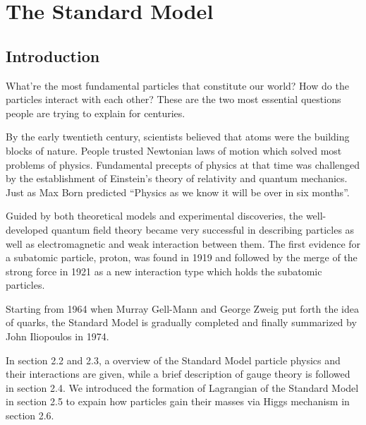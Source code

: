 \chapter{The Standard Model}

\label{ch:Standard Model}

\section{Introduction}
\par   What're the most fundamental particles that constitute our world? How do the particles interact with each other? These are the two most essential questions people are trying to explain for centuries.

\par By the early twentieth century, scientists believed that atoms were the building blocks of nature. People trusted Newtonian laws of motion which solved most problems of physics.
Fundamental precepts of physics at that time was challenged by the establishment of Einstein's theory of relativity and quantum mechanics.
Just as Max Born predicted ``Physics as we know it will be over in six months''.

\par Guided by both theoretical models and experimental discoveries, the well-developed quantum field theory became very successful in describing particles as well as 
electromagnetic and weak interaction between them. The first evidence for a subatomic particle, proton, was found in 1919 and followed by the merge of the strong force in 1921 as a new interaction type which holds the subatomic particles. 

\par Starting from 1964 when Murray Gell-Mann and George Zweig put forth the idea of quarks, 
the Standard Model is gradually completed and finally summarized by John Iliopoulos in 1974.

\par In section 2.2 and 2.3, a overview of the Standard Model particle physics and their interactions are given, while
a brief description of gauge theory is followed in section 2.4. We introduced the formation of Lagrangian of the Standard Model in section 2.5 to expain 
how particles gain their masses via Higgs mechanism in section 2.6.

